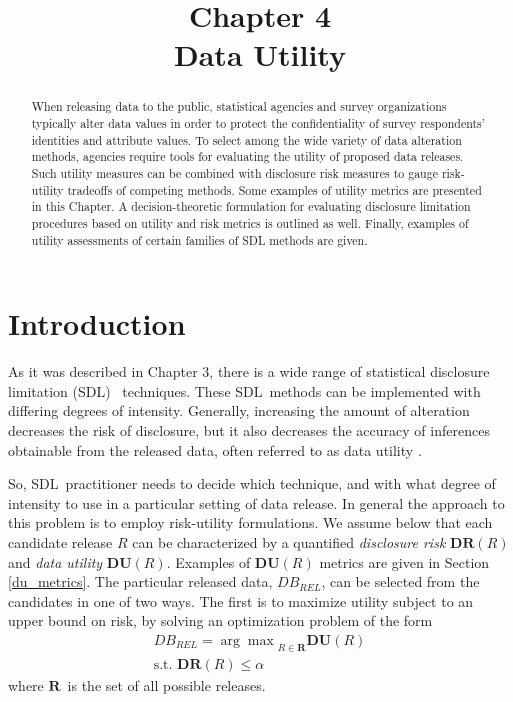 \documentclass[12pt]{article}
\def\DR{\ensuremath{\mathbf{DR}}} %
\def\DU{\ensuremath{\mathbf{DU}}} %
\def\RS{\ensuremath{\mathbf{R}}} %
\def\SDL{statistical disclosure limitation (SDL)%
    \gdef\SDL{SDL}}
\begin{document}
\title{Chapter 4
\\
Data Utility}


\maketitle

\begin{abstract}
When releasing data to the public, statistical agencies and survey
organizations typically alter data values in order to protect the
confidentiality of survey respondents' identities and attribute
values.  To select among the wide variety of data alteration
methods, agencies require tools for evaluating the utility of
proposed data releases.  Such utility measures can be combined
with disclosure risk measures to gauge risk-utility tradeoffs of
competing methods.  Some examples of utility metrics are presented in this Chapter.
A  decision-theoretic formulation for evaluating
disclosure limitation procedures based on utility and risk metrics is outlined
as well. Finally, examples of utility assessments of certain families of SDL methods are 
given. 


\end{abstract}

\section{Introduction}\label{sec.intro}

As it was described in Chapter 3, there is a wide range of \SDL\ techniques.
These \SDL\ methods can be implemented with differing degrees of
intensity.  Generally, increasing the amount of alteration
decreases the risk of disclosure, but it also decreases the
accuracy of inferences obtainable from the released data, often
referred to as data utility \citep{Hund10}.

So,  \SDL\ practitioner needs to decide which technique, and with what
degree of intensity to use in a particular setting of data release. 
In general the approach to this problem is to employ risk-utility formulations. We assume
below that each candidate release $R$ can be characterized by a quantified
\textit{disclosure risk} $\DR (R)$ and \textit{data utility} $\DU
(R)$.  Examples of $\DU(R)$ metrics are given in Section \ref{du_metrics}.
The particular released data, $DB_{REL}$, can be selected from
the candidates in one of two ways. The first is to maximize
utility subject to an upper bound on risk, by solving an
optimization problem of the form
\begin{equation}\label{eq.opt}
\begin{array}{l}
DB_{REL} = {\arg\max}_{R \in \RS} \DU (R) \\[1ex]
\mbox{s.t. } \DR(R) \leq \alpha
\end{array}
\end{equation}
where \RS\ is the set of all possible releases. 
\end{document}
